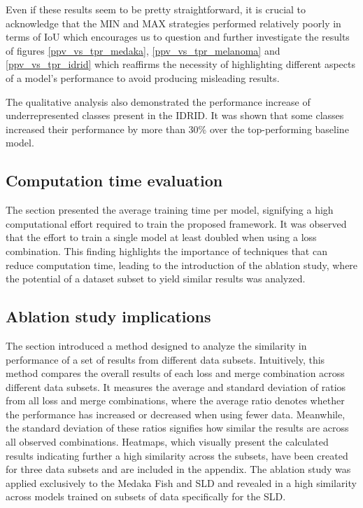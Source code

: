 Even if these results seem to be pretty straightforward, it is crucial to acknowledge that the MIN and MAX strategies performed relatively poorly in terms of \ac{IoU} which encourages us to question and further investigate the results of figures \ref{ppv_vs_tpr_medaka}, \ref{ppv_vs_tpr_melanoma} and \ref{ppv_vs_tpr_idrid} which reaffirms the necessity of highlighting different aspects of a model's performance to avoid producing misleading results. 

The qualitative analysis also demonstrated the performance increase of underrepresented classes present in the \ac{IDRID}. It was shown that some classes increased their performance by more than 30\% over the top-performing baseline model.

\subsection{Computation time evaluation}
The  section presented the average training time per model, signifying a high computational effort required to train the proposed framework. It was observed that the effort to train a single model at least doubled when using a loss combination. This finding highlights the importance of techniques that can reduce computation time, leading to the introduction of the ablation study, where the potential of a dataset subset to yield similar results was analyzed.

\subsection{Ablation study implications}
The  section introduced a method designed to analyze the similarity in performance of a set of results from different data subsets. Intuitively, this method compares the overall results of each loss and merge combination across different data subsets. It measures the average and standard deviation of ratios from all loss and merge combinations, where the average ratio denotes whether the performance has increased or decreased when using fewer data. Meanwhile, the standard deviation of these ratios signifies how similar the results are across all observed combinations. Heatmaps, which visually present the calculated results indicating further a high similarity across the subsets, have been created for three data subsets and are included in the appendix. The ablation study was applied exclusively to the Medaka Fish and \acf{SLD} and revealed in  a high similarity across models trained on subsets of data specifically for the \ac{SLD}.
